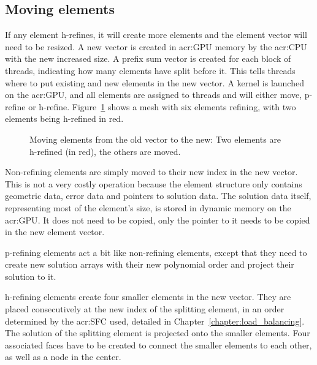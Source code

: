 \subsection{Moving elements}\label{subsection:adaptive_mesh_refinement:implementation:moving_elements}

If any element h-refines, it will create more elements and the element vector will need to be
resized. A new vector is created in \acrshort{acr:GPU} memory by the \acrshort{acr:CPU} with the new
increased size. A prefix sum vector is created for each block of threads, indicating how many
elements have split before it. This tells threads where to put existing and new elements in the new
vector. A kernel is launched on the \acrshort{acr:GPU}, and all elements are assigned to threads and
will either move, p-refine or h-refine. Figure~\ref{fig:refinement_offset} shows a mesh with six
elements refining, with two elements being h-refined in red.

\begin{figure}[H]
    \centering
    
    \caption{Moving elements from the old vector to the new: Two elements are h-refined (in red), the others are moved.}\label{fig:refinement_offset}
\end{figure}

Non-refining elements are simply moved to their new index in the new vector. This is not a very
costly operation because the element structure only contains geometric data, error data and pointers
to solution data. The solution data itself, representing most of the element's size, is stored in
dynamic memory on the \acrshort{acr:GPU}. It does not need to be copied, only the pointer to it
needs to be copied in the new element vector. 

\noindent
p-refining elements act a bit like non-refining elements, except that they need to create new
solution arrays with their new polynomial order and project their solution to it.

\noindent
h-refining elements create four smaller elements in the new vector. They are placed consecutively at
the new index of the splitting element, in an order determined by the \acrfull{acr:SFC} used,
detailed in Chapter~\ref{chapter:load_balancing}. The solution of the splitting element is projected
onto the smaller elements. Four associated faces have to be created to connect the smaller elements
to each other, as well as a node in the center. 

